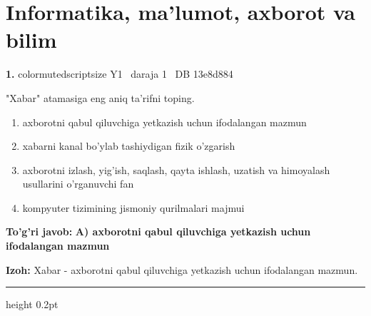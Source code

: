 \documentclass[10pt,a4paper,oneside]{article}
\begin{document}
\section{Informatika, ma'lumot, axborot va bilim}

\noindent\textbf{\color{ink}1.}  {color{muted}scriptsize Y1 \textbullet\ daraja 1 \textbullet\ DB 13e8d884}
\par
"Xabar" atamasiga eng aniq ta'rifni toping.
\begin{enumerate}[label=\Alph*),leftmargin=9mm]
\item axborotni qabul qiluvchiga yetkazish uchun ifodalangan mazmun
\item xabarni kanal bo'ylab tashiydigan fizik o'zgarish
\item axborotni izlash, yig'ish, saqlash, qayta ishlash, uzatish va himoyalash usullarini o'rganuvchi fan
\item kompyuter tizimining jismoniy qurilmalari majmui
\end{enumerate}
\begin{tcolorbox}[enhanced,breakable,colback=teal!4,colframe=teal!50!black,boxrule=0.5pt,arc=1.1mm,left=3mm,right=3mm,top=1.7mm,bottom=1.7mm,before skip=2mm,after skip=2mm]
\textbf{\color{teal}To'g'ri javob:} \textbf{A) axborotni qabul qiluvchiga yetkazish uchun ifodalangan mazmun}
\par\smallskip
\textbf{Izoh:} Xabar - axborotni qabul qiluvchiga yetkazish uchun ifodalangan mazmun.
\end{tcolorbox}
\vspace{2mm}\hrule height 0.2pt \vspace{3mm}
\end{document}
